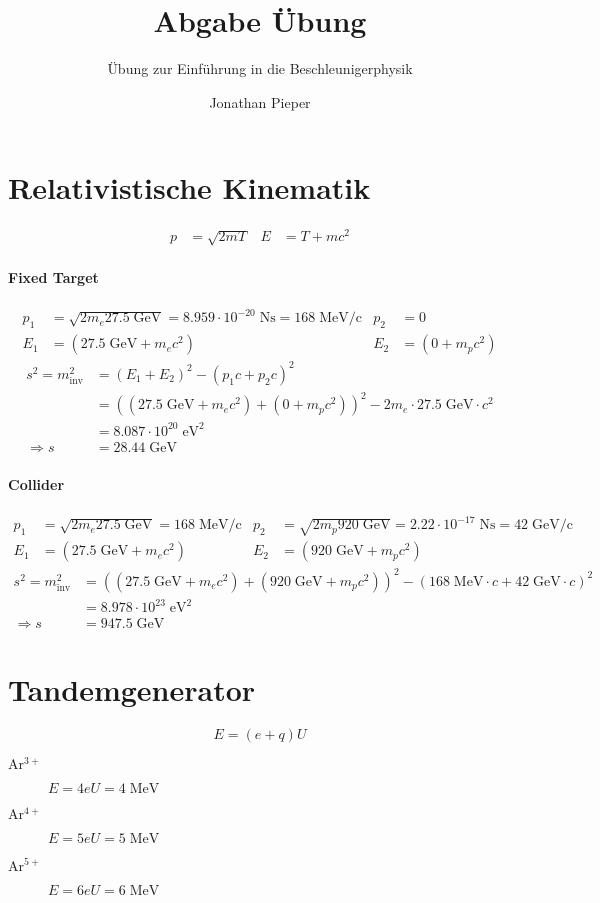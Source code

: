 \documentclass[12pt,DIV=15,a4paper,twoside,draft=false]{scrartcl}
\author{Jonathan Pieper}
\title{Abgabe Übung \blatt{}}
\subtitle{Übung zur Einführung in die Beschleunigerphysik}
\newcommand{\blatt}{2}
\begin{document}
\maketitle
\titlelabel{Aufgabe \blatt{}.\thesection{} }

\section{Relativistische Kinematik}
\begin{align*}
p &= \sqrt{2mT} &
E &= T + mc^2
\end{align*}
\paragraph{Fixed Target}
\begin{align*}
p_1 &= \sqrt{2 m_e 27.5\;\mathrm{GeV}} = 
8.959\cdot 10^{-20}\;\mathrm{Ns} = 168\;\mathrm{MeV/c} & 
p_2 &= 0\\
E_1 &= (27.5\;\mathrm{GeV} + m_e c^2) & 
E_2 &= (0 + m_p c^2)
\end{align*}
\begin{align*}
s^2 = m_{\mathrm{inv}}^2 &=
 (E_1 + E_2)^2 - (p_1c + p_2c)^2\\
  &=  ((27.5\;\mathrm{GeV} + m_e c^2) + (0+ m_p c^2))^2 - 2 m_e \cdot 27.5\;\mathrm{GeV} \cdot c^2\\
&= 8.087\cdot 10^{20}\;\mathrm{eV}^2 \\
⇒ s &= 28.44\;\mathrm{GeV}
\end{align*}
\paragraph{Collider}
\begin{align*}
p_1 &= \sqrt{2 m_e 27.5\;\mathrm{GeV}} = 168\;\mathrm{MeV/c}& 
p_2 &= \sqrt{2 m_p 920\;\mathrm{GeV}} = 2.22\cdot 10^{-17}\;\mathrm{Ns} = 42\;\mathrm{GeV/c}\\
E_1 &= (27.5\;\mathrm{GeV} + m_e c^2) & 
E_2 &= (920\;\mathrm{GeV} + m_p c^2)
\end{align*}
\begin{align*}
s^2 = m_{\mathrm{inv}}^2 &=
 ((27.5\;\mathrm{GeV} + m_e c^2) + (920\;\mathrm{GeV} + m_p c^2))^2 - 
(168\;\mathrm{MeV}\cdot c + 42\;\mathrm{GeV}\cdot c)^2\\
&= 8.978\cdot 10^{23}\;\mathrm{eV}^2\\
⇒ s &= 947.5 \;\mathrm{GeV}
\end{align*}

\section{Tandemgenerator}
$$ E = (e+q) U $$
\begin{description}
\item[$\mathrm{Ar^{3+}}$] $ E = 4 e U = 4 \;\mathrm{MeV}$
\item[$\mathrm{Ar^{4+}}$] $ E = 5 e U = 5 \;\mathrm{MeV}$
\item[$\mathrm{Ar^{5+}}$] $ E = 6 e U = 6 \;\mathrm{MeV}$
\end{description}
\end{document}
